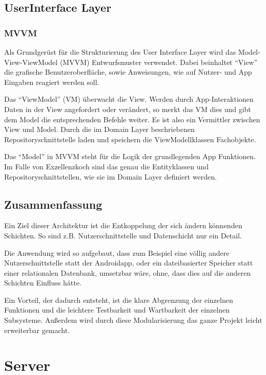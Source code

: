 \subsection{UserInterface Layer}

\subsubsection{MVVM} 
Als Grundgerüst für die Strukturierung des User Interface Layer wird das Model-View-ViewModel (MVVM) Entwurfsmuster verwendet. 
Dabei beinhaltet "`View"' die grafische Benutzeroberfläche, sowie Anweisungen, wie auf Nutzer- und App Eingaben reagiert werden soll. 

Das "`ViewModel"' (VM) überwacht die View. Werden durch App-Interaktionen Daten in der View angefordert oder verändert, so merkt das VM dies und gibt dem Model die entsprechenden Befehle weiter. Es ist also ein Vermittler zwischen View und Model.
Durch die im Domain Layer beschriebenen Repositoryschnittstelle laden und speichern die ViewModellklassen Fachobjekte. 

Das "`Model"' in MVVM steht für die Logik der grundlegenden App Funktionen. Im Falle von Exzellenzkoch sind das genau die Entityklassen und Repositoryschnittstellen, wie sie im Domain Layer definiert werden. 


\subsection{Zusammenfassung}
Ein Ziel dieser Architektur ist die Entkoppelung der sich ändern könnenden Schichten. So sind z.B. Nutzerschnittstelle und Datenschicht nur ein Detail. 

Die Anwendung wird so aufgebaut, dass zum Beispiel eine völlig andere Nutzerschnittstelle statt der Androidapp, oder ein dateibasierter Speicher statt einer relationalen Datenbank, umsetzbar wäre, ohne, dass dies auf die anderen Schichten Einfluss hätte.

Ein Vorteil, der dadurch entsteht, ist die klare Abgrenzung der einzelnen Funktionen und die leichtere Testbarkeit und Wartbarkeit der einzelnen Subsysteme. Außerdem wird durch diese Modularisierung das ganze Projekt leicht erweiterbar gemacht.

\section{Server}

